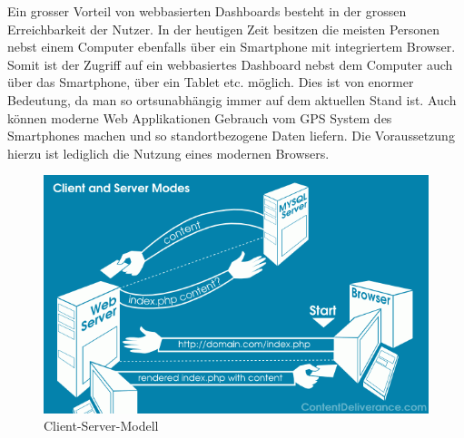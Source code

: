 Ein grosser Vorteil von webbasierten Dashboards besteht in der grossen Erreichbarkeit der Nutzer. In der heutigen Zeit besitzen die meisten Personen nebst einem Computer ebenfalls über ein Smartphone mit integriertem Browser. Somit ist der Zugriff auf ein webbasiertes Dashboard nebst dem Computer auch über das Smartphone, über ein Tablet etc. möglich. Dies ist von enormer Bedeutung, da man so ortsunabhängig immer auf dem aktuellen Stand ist. Auch können moderne Web Applikationen Gebrauch vom GPS System des Smartphones machen und so standortbezogene Daten liefern. Die Voraussetzung hierzu ist lediglich die Nutzung eines modernen Browsers.

\begin{figure}[ht]
	\includegraphics[width=12cm]{images/client_server_model.png}
	\centering
	\caption{Client-Server-Modell ~\citep{client_server_model}}
\end{figure}